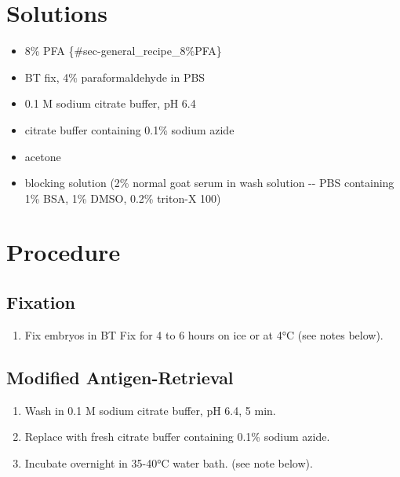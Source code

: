 \documentclass[
  letterpaper,
  DIV=11,
  numbers=noendperiod]{scrreprt}
\providecommand{\tightlist}{%
  \setlength{\itemsep}{0pt}\setlength{\parskip}{0pt}}\usepackage{longtable,booktabs,array}
\begin{document}
\hypertarget{solutions-41}{%
\section{Solutions}\label{solutions-41}}

\begin{itemize}
\tightlist
\item
  8\% PFA \{\#sec-general\_recipe\_8\%PFA\}
\item
  BT fix, 4\% paraformaldehyde in PBS
\item
  0.1 M sodium citrate buffer, pH 6.4
\item
  citrate buffer containing 0.1\% sodium azide
\item
  acetone
\item
  blocking solution (2\% normal goat serum in wash solution -\/- PBS
  containing 1\% BSA, 1\% DMSO, 0.2\% triton-X 100)
\end{itemize}

\hypertarget{procedure-44}{%
\section{Procedure}\label{procedure-44}}

\hypertarget{fixation}{%
\subsection{Fixation}\label{fixation}}

\begin{enumerate}
\def\labelenumi{\arabic{enumi}.}
\tightlist
\item
  Fix embryos in BT Fix for 4 to 6 hours on ice or at 4°C (see notes
  below).
\end{enumerate}

\hypertarget{modified-antigen-retrieval}{%
\subsection{Modified
Antigen-Retrieval}\label{modified-antigen-retrieval}}

\begin{enumerate}
\def\labelenumi{\arabic{enumi}.}
\setcounter{enumi}{1}
\tightlist
\item
  Wash in 0.1 M sodium citrate buffer, pH 6.4, 5 min.
\item
  Replace with fresh citrate buffer containing 0.1\% sodium azide.
\item
  Incubate overnight in 35-40°C water bath. (see note below).
\end{enumerate}
\end{document}

